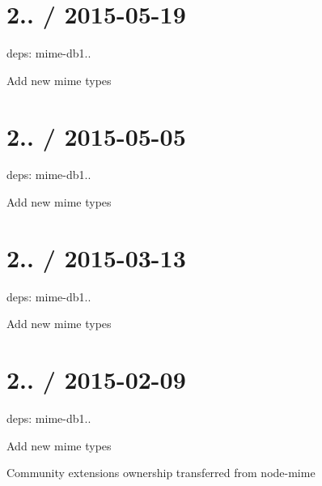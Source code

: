 \section*{2.. / 2015-\/05-\/19 }


\begin{DoxyItemize}
\item deps\+: mime-\/db1..
\begin{DoxyItemize}
\item Add new mime types
\end{DoxyItemize}
\end{DoxyItemize}

\section*{2.. / 2015-\/05-\/05 }


\begin{DoxyItemize}
\item deps\+: mime-\/db1..
\begin{DoxyItemize}
\item Add new mime types
\end{DoxyItemize}
\end{DoxyItemize}

\section*{2.. / 2015-\/03-\/13 }


\begin{DoxyItemize}
\item deps\+: mime-\/db1..
\begin{DoxyItemize}
\item Add new mime types
\end{DoxyItemize}
\end{DoxyItemize}

\section*{2.. / 2015-\/02-\/09 }


\begin{DoxyItemize}
\item deps\+: mime-\/db1..
\begin{DoxyItemize}
\item Add new mime types
\item Community extensions ownership transferred from {\ttfamily node-\/mime}
\end{DoxyItemize}
\end{DoxyItemize}

